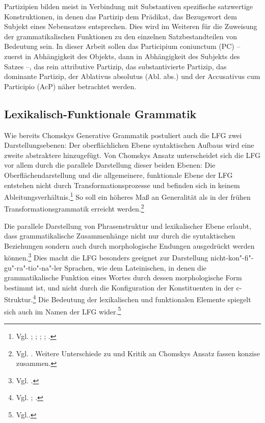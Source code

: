 \documentclass[12pt,a4paper]{article}
\begin{document}
Partizipien bilden meist in Verbindung mit Substantiven spezifische satzwertige Konstruktionen, in denen das Partizip dem Prädikat, das Bezugswort dem Subjekt eines Nebensatzes entsprechen. Dies wird im Weiteren für die Zuweisung der grammatikalischen Funktionen zu den einzelnen Satzbestandteilen von Bedeutung sein.
In dieser Arbeit sollen das Participium coniunctum (PC) -- zuerst in Abhängigkeit des Objekts, dann in Abhängigkeit des Subjekts des Satzes --, das rein attributive Partizip, das substantivierte Partizip, das dominante Partizip, der Ablativus absolutus (Abl. abs.) und der Accusativus cum Participio (AcP) näher betrachtet werden.

\subsection{Lexikalisch-Funktionale Grammatik}
Wie bereits Chomskys Generative Grammatik postuliert auch die LFG zwei Darstellungsebenen: Der oberflächlichen Ebene syntaktischen Aufbaus wird eine zweite abstraktere hinzugefügt. Von Chomskys Ansatz unterscheidet sich die LFG vor allem durch die parallele Darstellung dieser beiden Ebenen: Die Oberflächendarstellung und die allgemeinere, funktionale Ebene der LFG entstehen nicht durch Transformationsprozesse und befinden sich in keinem Ableitungsverhältnis.\footnote{Vgl. \cite[64]{Falk}; \cite[8]{Skript}; \cite[2; 4; 7]{Dal}; \cite[3-4]{Bresnan}; \cite[11; 13]{Rohrer}.} So soll ein höheres Maß an Generalität als in der frühen Transformationsgrammatik erreicht werden.\footnote{Vgl. \cite[1-3; 9]{Dal}. Weitere Unterschiede zu und Kritik an Chomskys Ansatz fassen \cite[11]{Rohrer} konzise zusammen.}

Die parallele Darstellung von Phrasenstruktur und lexikalischer Ebene erlaubt, dass grammatikalische Zusammenhänge nicht nur durch die syntaktischen Beziehungen sondern auch durch morphologische Endungen ausgedrückt werden können.\footnote{Vgl. \cite[10; 14]{Bresnan}.} Dies macht die LFG besonders geeignet zur Darstellung nicht-kon"-fi"-gu"-ra"-tio"-na"-ler Sprachen, wie dem Lateinischen, in denen die grammatikalische Funktion eines Wortes durch dessen morphologische Form bestimmt ist, und nicht durch die Konfiguration der Konstituenten in der c-Struktur.\footnote{Vgl. \cite[19]{Rohrer}; \cite[65]{Dal}.} Die Bedeutung der lexikalischen und funktionalen Elemente spiegelt sich auch im Namen der LFG wider.\footnote{Vgl.\cite[3]{Dal}.}
\end{document}
